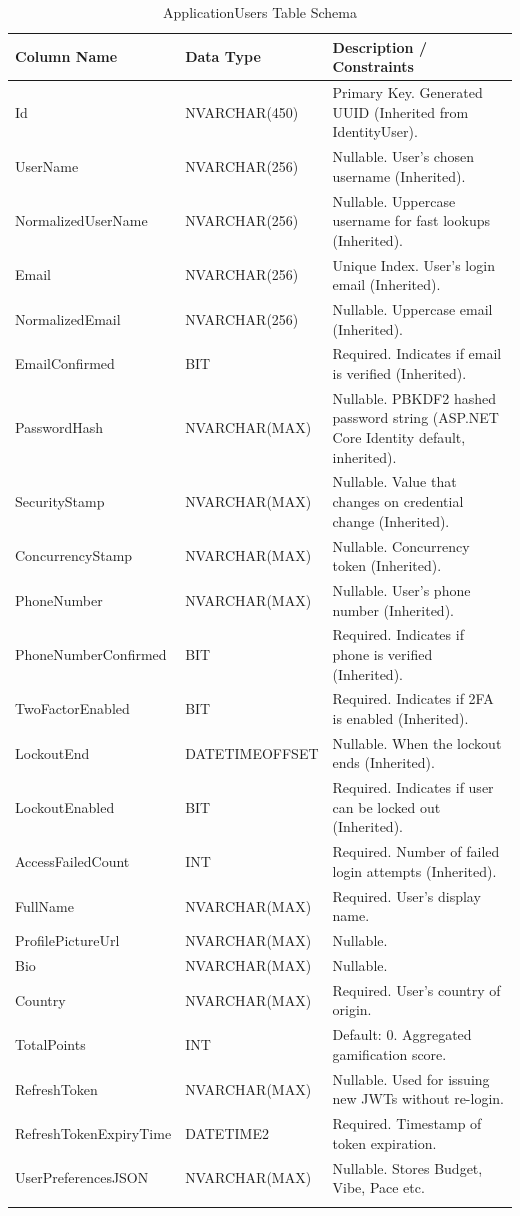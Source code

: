 \begin{longtable}{|l|l|p{6cm}|}
\hline
\textbf{Column Name} & \textbf{Data Type} & \textbf{Description / Constraints} \\ \hline
Id & NVARCHAR(450) & Primary Key. Generated UUID (Inherited from IdentityUser). \\ \hline
UserName & NVARCHAR(256) & Nullable. User's chosen username (Inherited). \\ \hline
NormalizedUserName & NVARCHAR(256) & Nullable. Uppercase username for fast lookups (Inherited). \\ \hline
Email & NVARCHAR(256) & Unique Index. User's login email (Inherited). \\ \hline
NormalizedEmail & NVARCHAR(256) & Nullable. Uppercase email (Inherited). \\ \hline
EmailConfirmed & BIT & Required. Indicates if email is verified (Inherited). \\ \hline
PasswordHash & NVARCHAR(MAX) & Nullable. PBKDF2 hashed password string (ASP.NET Core Identity default, inherited). \\ \hline
SecurityStamp & NVARCHAR(MAX) & Nullable. Value that changes on credential change (Inherited). \\ \hline
ConcurrencyStamp & NVARCHAR(MAX) & Nullable. Concurrency token (Inherited). \\ \hline
PhoneNumber & NVARCHAR(MAX) & Nullable. User's phone number (Inherited). \\ \hline
PhoneNumberConfirmed & BIT & Required. Indicates if phone is verified (Inherited). \\ \hline
TwoFactorEnabled & BIT & Required. Indicates if 2FA is enabled (Inherited). \\ \hline
LockoutEnd & DATETIMEOFFSET & Nullable. When the lockout ends (Inherited). \\ \hline
LockoutEnabled & BIT & Required. Indicates if user can be locked out (Inherited). \\ \hline
AccessFailedCount & INT & Required. Number of failed login attempts (Inherited). \\ \hline
FullName & NVARCHAR(MAX) & Required. User's display name. \\ \hline
ProfilePictureUrl & NVARCHAR(MAX) & Nullable. \\ \hline
Bio & NVARCHAR(MAX) & Nullable. \\ \hline
Country & NVARCHAR(MAX) & Required. User's country of origin. \\ \hline
TotalPoints & INT & Default: 0. Aggregated gamification score. \\ \hline
RefreshToken & NVARCHAR(MAX) & Nullable. Used for issuing new JWTs without re-login. \\ \hline
RefreshTokenExpiryTime & DATETIME2 & Required. Timestamp of token expiration. \\ \hline
UserPreferencesJSON & NVARCHAR(MAX) & Nullable. Stores Budget, Vibe, Pace etc. \\ \hline
\caption{ApplicationUsers Table Schema}
\end{longtable}

